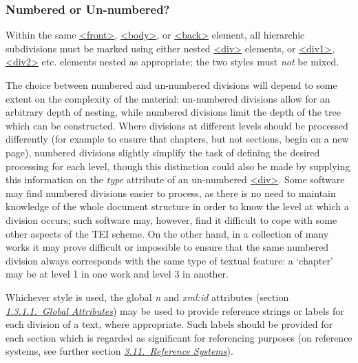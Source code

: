 \subsubsection[{Numbered or Un-numbered?}]{Numbered or Un-numbered?}\label{DSDIV3}\par
Within the same \hyperref[TEI.front]{<front>}, \hyperref[TEI.body]{<body>}, or \hyperref[TEI.back]{<back>} element, all hierarchic subdivisions must be marked using either nested \hyperref[TEI.div]{<div>} elements, or \hyperref[TEI.div1]{<div1>}, \hyperref[TEI.div2]{<div2>} etc. elements nested as appropriate; the two styles must \textit{not} be mixed.\par
The choice between numbered and un-numbered divisions will depend to some extent on the complexity of the material: un-numbered divisions allow for an arbitrary depth of nesting, while numbered divisions limit the depth of the tree which can be constructed. Where divisions at different levels should be processed differently (for example to ensure that chapters, but not sections, begin on a new page), numbered divisions slightly simplify the task of defining the desired processing for each level, though this distinction could also be made by supplying this information on the {\itshape type} attribute of an un-numbered \hyperref[TEI.div]{<div>}. Some software may find numbered divisions easier to process, as there is no need to maintain knowledge of the whole document structure in order to know the level at which a division occurs; such software may, however, find it difficult to cope with some other aspects of the TEI scheme. On the other hand, in a collection of many works it may prove difficult or impossible to ensure that the same numbered division always corresponds with the same type of textual feature: a ‘chapter’ may be at level 1 in one work and level 3 in another.\par
Whichever style is used, the global {\itshape n} and {\itshape xml:id} attributes (section \textit{\hyperref[STGA]{1.3.1.1.\ Global Attributes}}) may be used to provide reference strings or labels for each division of a text, where appropriate. Such labels should be provided for each section which is regarded as significant for referencing purposes (on reference systems, see further section \textit{\hyperref[CORS]{3.11.\ Reference Systems}}).\par
